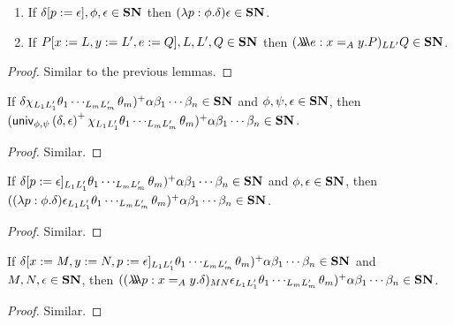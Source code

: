 
\begin{lemma}
\label{lm:SNothers}
$ $
\begin{enumerate}
\item
If $\delta[p:=\epsilon], \phi, \epsilon \in \mathbf{SN}$ then $(\lambda p:\phi.\delta)\epsilon \in \mathbf{SN}$.
\item
If $P[x:=L, y:=L', e:=Q], L, L', Q \in \mathbf{SN}$ then $(\lambda \!\! \lambda \!\! \lambda e:x =_A y.P)_{L L'} Q \in \mathbf{SN}$.
\end{enumerate}
\end{lemma}

\begin{proof}
Similar to the previous lemmas.
\end{proof}

\begin{lemma}
\label{lm:wte_loi1}
If $\delta \chi_{L_1 L_1'} \theta_1 \cdots_{L_m L_m'} \theta_m)^+ \alpha \beta_1 \cdots \beta_n \in \mathbf{SN}$ and $\phi, \psi, \epsilon \in \mathbf{SN}$, then
$(\mathsf{univ}_{{\phi} , {\psi}} \left( {\delta} , {\epsilon} \right)^+ \chi_{L_1 L_1'} \theta_1 \cdots_{L_m L_m'} \theta_m)^+ \alpha \beta_1 \cdots \beta_n \in \mathbf{SN}$.
\end{lemma}

\begin{proof}
Similar.
\end{proof}

\begin{lemma}
\label{lm:wte_loi2}
If $\delta[p:=\epsilon]_{L_1 L_1'} \theta_1 \cdots_{L_m L_m'} \theta_m)^+ \alpha \beta_1 \cdots \beta_n \in \mathbf{SN}$ and $\phi, \epsilon \in \mathbf{SN}$, then
$((\lambda p:\phi.\delta) \epsilon_{L_1 L_1'} \theta_1 \cdots_{L_m L_m'} \theta_m)^+ \alpha \beta_1 \cdots \beta_n \in \mathbf{SN}$.
\end{lemma}

\begin{proof}
Similar.
\end{proof}

\begin{lemma}
\label{lm:wte_loi3}
If $\delta[x:=M, y:=N, p:=\epsilon]_{L_1 L_1'} \theta_1 \cdots_{L_m L_m'} \theta_m)^+ \alpha \beta_1 \cdots \beta_n \in \mathbf{SN}$ and $M, N, \epsilon \in \mathbf{SN}$, then
$((\lambda \!\! \lambda \!\! \lambda p:x =_A y.\delta)_{MN} \epsilon_{L_1 L_1'} \theta_1 \cdots_{L_m L_m'} \theta_m)^+ \alpha \beta_1 \cdots \beta_n \in \mathbf{SN}$.
\end{lemma}

\begin{proof}
Similar.
\end{proof}